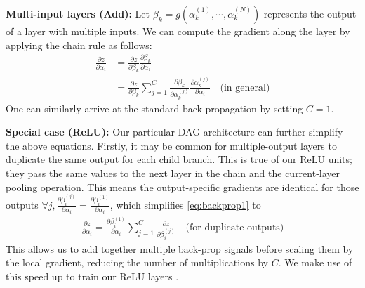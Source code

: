 \documentclass[10pt,twocolumn,letterpaper]{article}
\begin{document}
{\bf Multi-input layers (Add):} Let $\beta_k=g(\alpha^{(1)}_k,\cdots,\alpha^{(N)}_k)$ represents the output of a layer with multiple inputs. We can compute the gradient along the layer by applying the chain rule as follows:
\begin{align}
\frac{\partial z}{\partial \alpha_i}&=\frac{\partial z}{\partial \beta_k}\frac{\partial \beta_k}{\partial \alpha_i} \nonumber \\
&=\frac{\partial z}{\partial \beta_k}\sum_{j=1}^{C}\frac{\partial \beta_k}{\partial \alpha_k^{(j)}}\frac{\partial \alpha_k^{(j)}}{\partial \alpha_i} \quad \text{(in general)} \label{eq:backprop2}
\end{align} 
One can similarly arrive at the standard back-propagation by setting $C=1$.



{\bf Special case (ReLU):} Our particular DAG architecture can further simplify the above equations. Firstly, it may be common for multiple-output layers to duplicate the same output for each child branch. This is true of our ReLU units; they pass the same values to the next layer in the chain and the current-layer pooling operation. This means the output-specific gradients are identical for those outputs $\forall j, \frac{\partial \beta_i^{(j)}}{\partial \alpha_i} =  \frac{\partial \beta_i^{(1)}}{\partial \alpha_i}$, which simplifies \eqref{eq:backprop1} to
\begin{align}
\frac{\partial z}{\partial \alpha_i} = \frac{\partial \beta_i^{(1)}}{\partial \alpha_i} \sum_{j=1}^{C}\frac{\partial z}{\partial \beta_i^{(j)}} \quad \text{(for duplicate outputs)}
\end{align}
This allows us to add together multiple back-prop signals before scaling them by the local gradient, reducing 
the number of multiplications by $C$. We make use of this speed up to train our ReLU layers
. 
\end{document}

